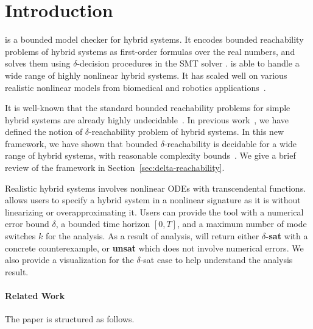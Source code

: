 \section{Introduction}\label{sec:intro}


\dReach{} is a bounded model checker for hybrid systems. It encodes
bounded reachability problems of hybrid systems as first-order
formulas over the real numbers, and solves them using
$\delta$-decision procedures in the SMT solver \dReal{}. \dReach{} is
able to handle a wide range of highly nonlinear hybrid systems. It has
scaled well on various realistic nonlinear models from biomedical and
robotics applications~\cite{}.

It is well-known that the standard bounded reachability problems for
simple hybrid systems are already highly
undecidable~\cite{DBLP:conf/rex/AlurD91,DBLP:conf/hybrid/AlurCHH92}. In
previous work~\cite{}, we have defined the notion of
$\delta$-reachability problem of hybrid systems. In this new
framework, we have shown that bounded $\delta$-reachability is
decidable for a wide range of hybrid systems, with reasonable
complexity bounds~\cite{}. We give a brief review of the framework in
Section~\ref{sec:delta-reachability}.

Realistic hybrid systems involves nonlinear ODEs with transcendental
functions. \dReach{} allows users to specify a hybrid system in a
nonlinear signature as it is without linearizing or overapproximating
it. Users can provide the tool with a numerical error bound $\delta$,
a bounded time horizon $[0, T]$, and a maximum number of mode switches
$k$ for the analysis. As a result of analysis, \dReach{} will return
either \textbf{$\delta$-sat} with a concrete counterexample, or
\textbf{unsat} which does not involve numerical errors. We also
provide a visualization for the $\delta$-sat case to help
understand the analysis result.


\paragraph{Related Work}

The paper is structured as follows.


